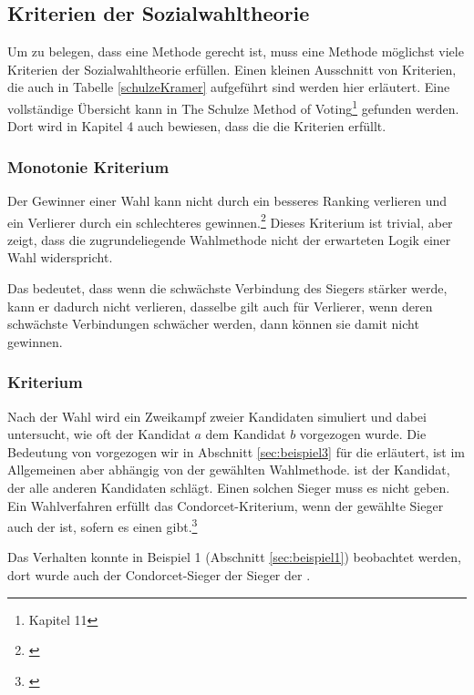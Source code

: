 \subsection{Kriterien der Sozialwahltheorie}
\label{sec:kriterienSozial}
Um zu belegen, dass eine Methode gerecht ist, muss eine Methode möglichst viele Kriterien der Sozialwahltheorie erfüllen. Einen kleinen Ausschnitt von Kriterien, die auch in Tabelle \ref{schulzeKramer} aufgeführt sind werden hier erläutert. Eine vollständige Übersicht kann in \glqq The Schulze Method
of Voting\grqq{}\footnote{\Vgl \citet{Schulze2018} Kapitel 11} gefunden werden. Dort wird in Kapitel 4 auch bewiesen, dass die \schulze die Kriterien erfüllt.


\subsubsection{Monotonie Kriterium} 
\label{sec:monotoniekriterium}
Der Gewinner einer Wahl kann nicht durch ein besseres Ranking verlieren und ein Verlierer durch ein schlechteres gewinnen.\footnote{\Vgl \citet{Woodall1996}} Dieses Kriterium ist trivial, aber zeigt, dass die zugrundeliegende Wahlmethode nicht der erwarteten Logik einer Wahl widerspricht.

Das bedeutet, dass wenn die schwächste Verbindung des Siegers stärker werde, kann er dadurch nicht verlieren, dasselbe gilt auch für Verlierer, wenn deren schwächste Verbindungen schwächer werden, dann können sie damit nicht gewinnen.

\subsubsection{\condorcet Kriterium} 
\label{sec:condorectKriterium}
Nach der Wahl wird ein Zweikampf zweier Kandidaten simuliert und dabei untersucht, wie oft der Kandidat $a$ dem Kandidat $b$ vorgezogen wurde. Die Bedeutung von \glqq vorgezogen\grqq{} wir in Abschnitt \ref{sec:beispiel3} für die \schulze erläutert, ist im Allgemeinen aber abhängig von der gewählten Wahlmethode. \condorcetSieger ist der Kandidat, der alle anderen Kandidaten schlägt. Einen solchen Sieger muss es nicht geben. Ein Wahlverfahren erfüllt das Condorcet-Kriterium, wenn der gewählte Sieger auch der \condorcetSieger ist, sofern es einen \condorcetSieger gibt.\footnote{\Vgl \citet{Johnson2005}}

Das Verhalten konnte in Beispiel 1 (Abschnitt \ref{sec:beispiel1}) beobachtet werden, dort wurde auch der Condorcet-Sieger der Sieger der \schulze .

